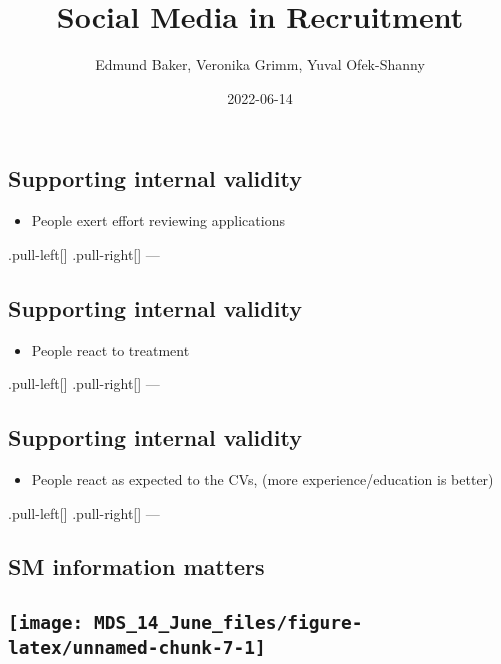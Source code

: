 \documentclass[
]{article}
\title{Social Media in Recruitment}
\author{Edmund Baker, Veronika Grimm, Yuval Ofek-Shanny}
\date{2022-06-14}
\providecommand{\tightlist}{%
  \setlength{\itemsep}{0pt}\setlength{\parskip}{0pt}}
\begin{document}
\maketitle

\hypertarget{supporting-internal-validity}{%
\subsection{Supporting internal
validity}\label{supporting-internal-validity}}

\begin{itemize}
\tightlist
\item
  People exert effort reviewing applications
\end{itemize}

.pull-left{[}{]} .pull-right{[}{]} ---

\hypertarget{supporting-internal-validity-1}{%
\subsection{Supporting internal
validity}\label{supporting-internal-validity-1}}

\begin{itemize}
\tightlist
\item
  People react to treatment
\end{itemize}

.pull-left{[}{]} .pull-right{[}{]} ---

\hypertarget{supporting-internal-validity-2}{%
\subsection{Supporting internal
validity}\label{supporting-internal-validity-2}}

\begin{itemize}
\tightlist
\item
  People react as expected to the CVs, (more experience/education is
  better)
\end{itemize}

.pull-left{[}{]} .pull-right{[}{]} ---

\hypertarget{sm-information-matters}{%
\subsection{SM information matters}\label{sm-information-matters}}

\hypertarget{section}{%
\subsection{\texorpdfstring{\texttt{[image: MDS\_14\_June\_files/figure-latex/unnamed-chunk-7-1]}}{}}\label{section}}
\end{document}
